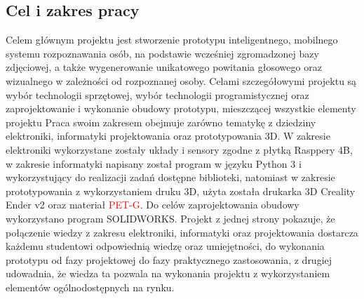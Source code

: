 \documentclass[a4paper,12pt,reqno]{article}
\begin{document}
\subsection{Cel i zakres pracy}
Celem głównym projektu jest stworzenie prototypu inteligentnego, mobilnego systemu rozpoznawania osób, na podstawie wcześniej zgromadzonej bazy zdjęciowej, a także wygenerowanie unikatowego powitania głosowego oraz wizualnego w zależności od rozpoznanej osoby.
\newline
Celami szczegółowymi projektu są wybór technologii sprzętowej, wybór technologii programistycznej oraz zaprojektowanie i wykonanie obudowy prototypu, mieszczącej wszystkie elementy projektu
\newline
Praca swoim zakresem obejmuje zarówno tematykę z dziedziny elektroniki, informatyki projektowania oraz prototypowania 3D.
\newline
W zakresie elektroniki wykorzystane zostały układy i sensory zgodne z płytką Rasppery 4B, w zakresie informatyki napisany został program w języku Python 3 i wykorzystujący do realizacji zadań dostępne biblioteki, natomiast w zakresie prototypowania z wykorzystaniem druku 3D, użyta została drukarka 3D Creality Ender v2 oraz materiał \textcolor{red}{PET-G}. Do celów zaprojektowania obudowy wykorzystano program SOLIDWORKS. %
\newline
Projekt z jednej strony pokazuje, że połączenie wiedzy z zakresu elektroniki, informatyki oraz projektowania dostarcza każdemu studentowi odpowiednią wiedzę oraz umiejętności, do wykonania prototypu od fazy projektowej do fazy praktycznego zastosowania,  z drugiej udowadnia, że wiedza ta pozwala na wykonania projektu z wykorzystaniem elementów ogólnodostępnych na rynku.
\end{document}
